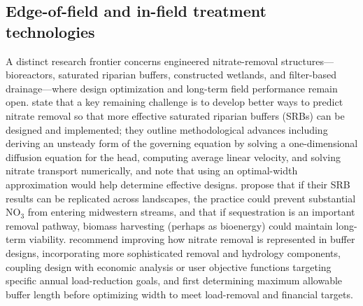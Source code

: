 \subsection{Edge-of-field and in-field treatment technologies}
A distinct research frontier concerns engineered nitrate-removal structures---bioreactors, saturated riparian buffers, constructed wetlands, and filter-based drainage---where design optimization and long-term field performance remain open. \textcite{McEachran2020} state that a key remaining challenge is to develop better ways to predict nitrate removal so that more effective saturated riparian buffers (SRBs) can be designed and implemented; they outline methodological advances including deriving an unsteady form of the governing equation by solving a one-dimensional diffusion equation for the head, computing average linear velocity, and solving nitrate transport numerically, and note that using an optimal-width approximation would help determine effective designs. \textcite{Jaynes2014} propose that if their SRB results can be replicated across landscapes, the practice could prevent substantial NO$_3$ from entering midwestern streams, and that if sequestration is an important removal pathway, biomass harvesting (perhaps as bioenergy) could maintain long-term viability. \textcite{Abdalaal2023} recommend improving how nitrate removal is represented in buffer designs, incorporating more sophisticated removal and hydrology components, coupling design with economic analysis or user objective functions targeting specific annual load-reduction goals, and first determining maximum allowable buffer length before optimizing width to meet load-removal and financial targets.

